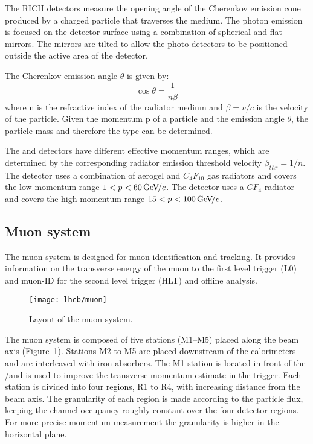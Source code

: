 The RICH detectors measure the opening angle of the Cherenkov emission cone
produced by a charged particle that traverses the medium. The photon emission
is focused on the detector surface using a combination of spherical and flat
mirrors. The mirrors are tilted to allow the photo detectors to be positioned
outside the active area of the detector.

The Cherenkov emission angle $\theta$ is given by:
$$\cos\theta = \frac{1}{n\beta}$$
\noindent where n is the refractive index of the radiator medium and 
$\beta = v/c$ is the velocity of the particle. Given the momentum p of a
particle and the emission angle $\theta$, the particle mass and therefore the
type can be determined.

The \richone and \richtwo detectors have different effective momentum ranges,
which are determined by the corresponding radiator emission threshold velocity
$\beta_{thr} = 1/n$. The \richone detector uses a combination of aerogel and
$C_4F_{10}$ gas radiators and covers the low momentum range $1<p<60 {\mathrm{\,Ge\kern -0.1em V\!/}c}$. The
\richtwo detector uses a $CF_4$ radiator and covers the high momentum range $15
< p < 100 {\mathrm{\,Ge\kern -0.1em V\!/}c}$.

\subsection{Muon system}

The \lhcb muon system is designed for muon identification and tracking. It
provides information on the transverse energy of the muon to the first level
trigger (L0) and muon-ID for the second level trigger (HLT) and offline
analysis.

\begin{figure}[tb]
\begin{center}
\texttt{[image: lhcb/muon]}
\end{center}
\caption{\small Layout of the muon system.}
\label{fig:muon}
\end{figure}

The muon system is composed of five stations (M1--M5) placed along the
beam axis (Figure~\ref{fig:muon}). Stations M2 to M5 are placed downstream of the
calorimeters and are interleaved with iron absorbers. The M1 station is
located in front of the \spd/\presh and is used to improve the transverse momentum
estimate in the trigger. Each station is divided into four regions, R1 to R4,
with increasing distance from the beam axis. The granularity of each region is
made according to the particle flux, keeping the channel occupancy roughly
constant over the four detector regions. For more precise momentum measurement
the granularity is higher in the horizontal plane.

